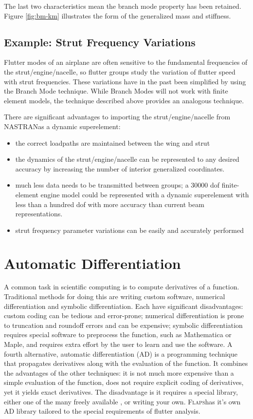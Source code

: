 \documentclass[11pt,openany,twoside]{book}
\numberwithin{equation}{section}		%
\newcommand{\Flaps}{\textsc{Flaps\:}}
\newcommand{\Nastran}{{\footnotesize{NASTRAN\:}}}
\begin{document}
The last two characteristics mean the branch mode property has been retained.
Figure \ref{fig:bm-km} illustrates the form of the generalized mass and stiffness.

\subsection{ Example: Strut Frequency Variations}
\par
Flutter modes of an airplane are often sensitive
to the fundamental frequencies of the strut/engine/nacelle,
so flutter groups study the variation of
flutter speed with strut frequencies.
These variations have in the past been simplified
by using the Branch Mode technique.
While Branch Modes will not work with finite element models,
the technique described above
provides an analogous technique.
\par
There are significant advantages to importing
the strut/engine/nacelle from \Nastran as a
dynamic superelement:

\begin{itemize}
\item
the correct loadpaths are maintained between
the wing and strut
\item
the dynamics of the strut/engine/nacelle can be
represented to any desired accuracy
by increasing the number of interior generalized
coordinates.
\item
much less data needs to be transmitted between groups;
a 30000 dof finite-element engine model could be represented
with a dynamic superelement with less than a hundred dof
with more accuracy than current beam representations.
\item
strut frequency parameter variations can be easily and
accurately performed
\end{itemize}


\section{Automatic Differentiation}\label{sect:AD}
A common task in scientific computing is to compute
derivatives of a function. Traditional methods for doing this
are writing custom software, numerical differentiation and symbolic differentiation.
Each have significant disadvantages: custom coding can be tedious
and error-prone; numerical differentiation
is prone to truncation and roundoff errors and can be expensive;
symbolic differentiation requires special software to preprocess
the function, such as Mathematica or Maple, and requires extra
effort by the user to learn and use the software.
A fourth alternative, automatic differentiation (AD)
\cite{rall1981automatic,autodiff}
is a programming technique that propagates derivatives
along with the evaluation of the function. It combines the advantages
of the other techniques: it is not much more expensive than
a simple evaluation of the function, does not require explicit coding
of derivatives, yet it yields exact derivatives.
The disadvantage is it requires a special library, either one of
the many freely available \cite{autodiff}, or writing your own.
\Flaps has it's own AD library tailored to the special requirements
of flutter analysis.
\par
\end{document}
